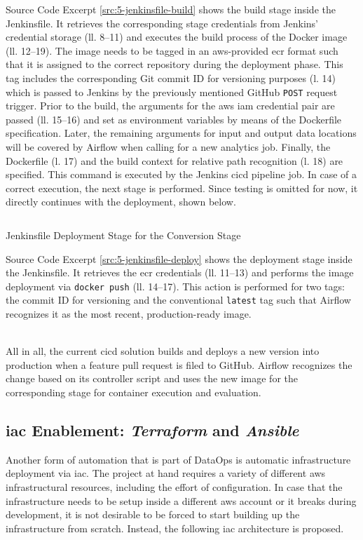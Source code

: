 Source Code Excerpt \ref{src:5-jenkinsfile-build} shows the build stage inside the Jenkinsfile. It retrieves the corresponding stage credentials from Jenkins' credential storage (ll. 8--11) and executes the build process of the Docker image (ll. 12--19). The image needs to be tagged in an \ac{aws}-provided \ac{ecr} format such that it is assigned to the correct repository during the deployment phase. This tag includes the corresponding Git commit ID for versioning purposes (l. 14) which is passed to Jenkins by the previously mentioned GitHub \texttt{POST} request trigger. Prior to the build, the arguments for the \ac{aws} \ac{iam} credential pair are passed (ll. 15--16) and set as environment variables by means of the Dockerfile specification. Later, the remaining arguments for input and output data locations will be covered by Airflow when calling for a new analytics job. Finally, the Dockerfile (l. 17) and the build context for relative path recognition (l. 18) are specified. This command is executed by the Jenkins \ac{cicd} pipeline job. In case of a correct execution, the next stage is performed. Since testing is omitted for now, it directly continues with the deployment, shown below. 

\begin{listing}[h!]
	\inputminted{groovy}{main-matter/src/5-jenkinsfile-deploy}
	\caption{Jenkinsfile Deployment Stage for the Conversion Stage}
	\label{src:5-jenkinsfile-deploy}
\end{listing}

Source Code Excerpt \ref{src:5-jenkinsfile-deploy} shows the deployment stage inside the Jenkinsfile. It retrieves the \ac{ecr} credentials (ll. 11--13) and performs the image deployment via \texttt{docker push} (ll. 14--17). This action is performed for two tags: the commit ID for versioning and the conventional \texttt{latest} tag such that Airflow recognizes it as the most recent, production-ready image. \\\

All in all, the current \ac{cicd} solution builds and deploys a new version into production when a feature pull request is filed to GitHub. Airflow recognizes the change based on its controller script and uses the new image for the corresponding stage for container execution and evaluation.

\subsection{\acs{iac} Enablement: \textit{Terraform} and \textit{Ansible}}
Another form of automation that is part of DataOps is automatic infrastructure deployment via \ac{iac}. The project at hand requires a variety of different \ac{aws} infrastructural resources, including the effort of configuration. In case that the infrastructure needs to be setup inside a different \ac{aws} account or it breaks during development, it is not desirable to be forced to start building up the infrastructure from scratch. Instead, the following \ac{iac} architecture is proposed.

